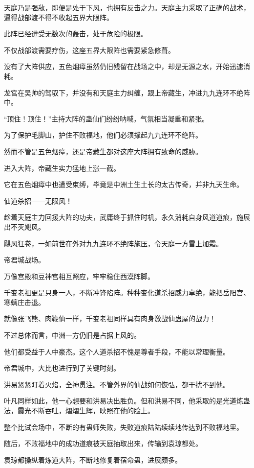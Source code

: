\begin{this_body}
天庭乃是强敌，即便是处于下风，也拥有反击之力。天庭主力采取了正确的战术，逼得战部渡不得不收起五界大限阵。

此阵已经遭受无数次的轰击，处于危险的极限。

不仅战部渡需要疗伤，这座五界大限阵也需要紧急修葺。

没有了大阵供应，五色烟瘴虽然仍旧残留在战场之中，却是无源之水，开始迅速消耗。

龙宫在吴帅的驾驭下，并没有和天庭主力纠缠，跟上帝藏生，冲进九九连环不绝阵中。

“顶住！顶住！”主持大阵的蛊仙们纷纷呐喊，气氛相当凝重和紧张。

为了保护毛脚山，护住不败福地，他们必须撑起九九连环不绝阵。

然而不管是五色烟瘴，还是帝藏生都对这座大阵拥有致命的威胁。

进入大阵，帝藏生实力猛地上涨一截。

它在五色烟瘴中也遭受束缚，毕竟是中洲土生土长的太古传奇，并非九天生命。

仙道杀招——无限风！

趁着天庭主力回援大阵的功夫，武庸终于抓住时机，永久消耗自身风道道痕，施展出不灭飓风。

飓风狂卷，一如前世在外对九九连环不绝阵施压，令天庭一方雪上加霜。

帝君城战场。

万像宫殿和豆神宫相互照应，牢牢稳住西漠阵脚。

千变老祖更是只身一人，不断冲锋陷阵。种种变化道杀招威力卓绝，能把岳阳宫、寒螭庄击退。

就像张飞熊、肉鞭仙一样，千变老祖同样具有肉身激战仙蛊屋的战力！

不过总体而言，中洲一方仍旧是占据上风的。

他们都受益于人中豪杰。这个人道杀招不愧是尊者手段，不能以常理衡量。

帝君城中，大比也进行到了关键时刻。

洪易紧紧盯着火焰，全神贯注。不管外界的仙战如何恢弘，都干扰不到他。

叶凡同样如此，他一心想要和洪易决出胜负。但和洪易不同，他采取的是光道炼蛊法，霞光不断吞吐，熠熠生辉，映照在他的脸上。

整个比试会场中，不断的有蛊师失败，失败道痕陆陆续续地传达到不败福地里。

随后，不败福地中的成功道痕被天庭抽取出来，传输到袁琼都处。

袁琼都操纵着炼道大阵，不断地修复着宿命蛊，进展颇多。


\end{this_body}
